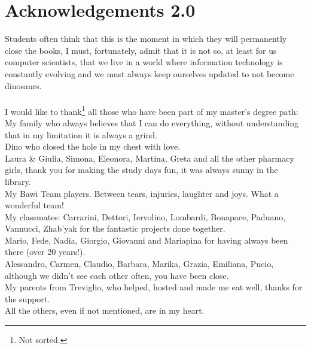 \chapter*{Acknowledgements 2.0}

Students often think that this is the moment in which they will permanently close the books, I must, fortunately, admit that it is not so, at least for us computer scientists, that we live in a world where information technology is constantly evolving and we must always keep ourselves updated to not become dinosaurs.\\
\\
I would like to thank\footnote{Not sorted.} all those who have been part of my master's degree path:\\
My family who always believes that I can do everything, without understanding that in my limitation it is always a grind.\\
Dino who closed the hole in my chest with love.\\
Laura \& Giulia, Simona, Eleonora, Martina, Greta and all the other pharmacy girls, thank you for making the study days fun, it was always sunny in the library.\\
My Bawi Team players. Between tears, injuries, laughter and joys. What a wonderful team!\\
My classmates: Carrarini, Dettori, Iervolino, Lombardi, Bonapace, Paduano, Vannucci, Zhab'yak for the fantastic projects done together.\\
Mario, Fede, Nadia, Giorgio, Giovanni and Mariapina for having always been there (over 20 years!).\\
Alessandro, Carmen, Claudio, Barbara, Marika, Grazia, Emiliana, Pucio, although we didn't see each other often, you have been close.\\
My parents from Treviglio, who helped, hosted and made me eat well, thanks for the support.\\
All the others, even if not mentioned, are in my heart.